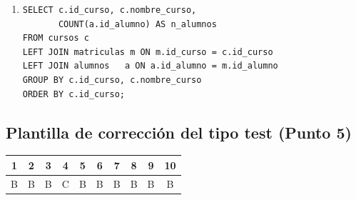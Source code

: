 \documentclass[11pt,a4paper]{article}
\begin{document}
\begin{enumerate}[leftmargin=1.2em,label=\textbf{\arabic*.}]
\item
\begin{lstlisting}
SELECT c.id_curso, c.nombre_curso,
       COUNT(a.id_alumno) AS n_alumnos
FROM cursos c
LEFT JOIN matriculas m ON m.id_curso = c.id_curso
LEFT JOIN alumnos   a ON a.id_alumno = m.id_alumno
GROUP BY c.id_curso, c.nombre_curso
ORDER BY c.id_curso;
\end{lstlisting}
\end{enumerate}

\subsection*{Plantilla de corrección del tipo test (Punto 5)}
\begin{center}
\begin{tabular}{cccccccccc}
\toprule
1 & 2 & 3 & 4 & 5 & 6 & 7 & 8 & 9 & 10 \\
\midrule
B & B & B & C & B & B & B & B & B & B \\
\bottomrule
\end{tabular}
\end{center}
\end{document}
